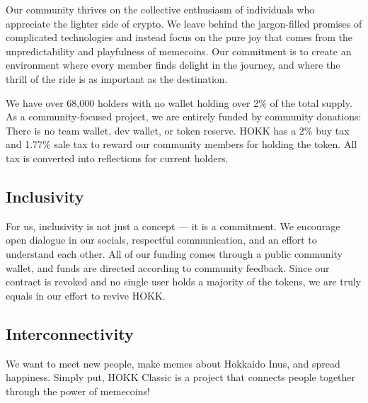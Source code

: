 \documentclass{article}
\begin{document}
Our community thrives on the collective enthusiasm of individuals who appreciate the lighter side of crypto. We leave behind the jargon-filled promises of complicated technologies and instead focus on the pure joy that comes from the unpredictability and playfulness of memecoins. Our commitment is to create an environment where every member finds delight in the journey, and where the thrill of the ride is as important as the destination.

We have over 68,000 holders with no wallet holding over 2\% of the total supply. As a community-focused project, we are entirely funded by community donations: There is no team wallet, dev wallet, or token reserve. HOKK has a 2\% buy tax and 1.77\% sale tax to reward our community members for holding the token. All tax is converted into reflections for current holders.

\subsection{Inclusivity}
For us, inclusivity is not just a concept --- it is a commitment. We encourage open dialogue in our socials, respectful communication, and an effort to understand each other. All of our funding comes through a public community wallet, and funds are directed according to community feedback. Since our contract is revoked and no single user holds a majority of the tokens, we are truly equals in our effort to revive HOKK.

\subsection{Interconnectivity}
We want to meet new people, make memes about Hokkaido Inus, and spread happiness. Simply put, HOKK Classic is a project that connects people together through the power of memecoins!
\end{document}
